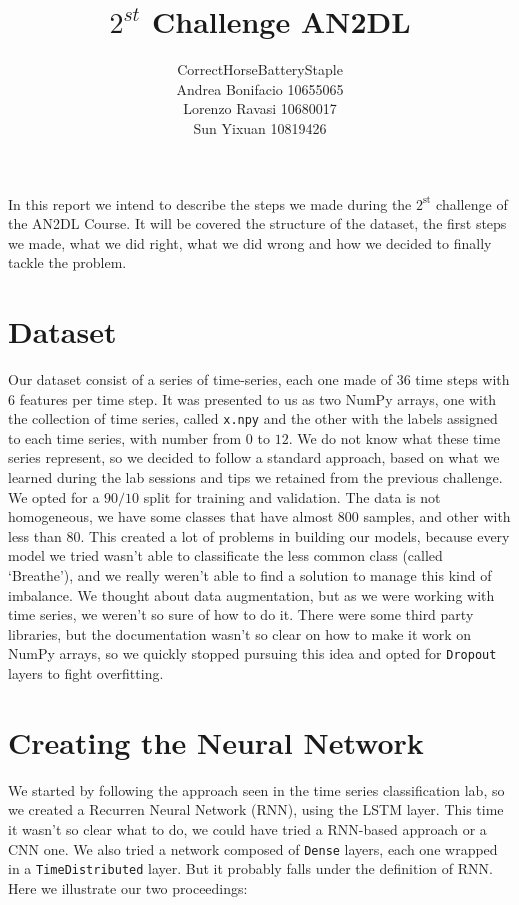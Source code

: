 \documentclass[a4paper,11pt]{article}
\newcommand{\code}[1]{\texttt{#1}}
\numberwithin{equation}{section}
\begin{document}
\title{\vspace{-3cm}\(2^{st}\) Challenge AN2DL}
\author{CorrectHorseBatteryStaple \\
Andrea Bonifacio 10655065 \\
Lorenzo Ravasi 10680017 \\
Sun Yixuan 10819426}
\date{}
\maketitle
In this report we intend to describe the steps we made during the \(2^{\text{st}}\) challenge of the AN2DL Course. It will be covered the structure of the dataset, the first steps we made, what we did right, what we did wrong and how we decided to finally tackle the problem.
\section*{Dataset}
Our dataset consist of a series of time-series, each one made of \(36\) time steps with \(6\) features per time step. It was presented to us as two NumPy arrays, one with the collection of time series, called \code{x.npy} and the other with the labels assigned to each time series, with number from \(0\) to \(12\). We do not know what these time series represent, so we decided to follow a standard approach, based on what we learned during the lab sessions and tips we retained from the previous challenge. We opted for a \(90/10\) split for training and validation. The data is not homogeneous, we have some classes that have almost \(800\) samples, and other with less than \(80\). This created a lot of problems in building our models, because every model we tried wasn't able to classificate the less common class (called `Breathe'), and we really weren't able to find a solution to manage this kind of imbalance. We thought about data augmentation, but as we were working with time series, we weren't so sure of how to do it. There were some third party libraries, but the documentation wasn't so clear on how to make it work on NumPy arrays, so we quickly stopped pursuing this idea and opted for \code{Dropout} layers to fight overfitting.
\section*{Creating the Neural Network}
We started by following the approach seen in the time series classification lab, so we created a Recurren Neural Network (RNN), using the LSTM layer. This time it wasn't so clear what to do, we could have tried a RNN-based approach or a CNN one. We also tried a network composed of \code{Dense} layers, each one wrapped in a \code{TimeDistributed} layer. But it probably falls under the definition of RNN. Here we illustrate our two proceedings:
\end{document}

